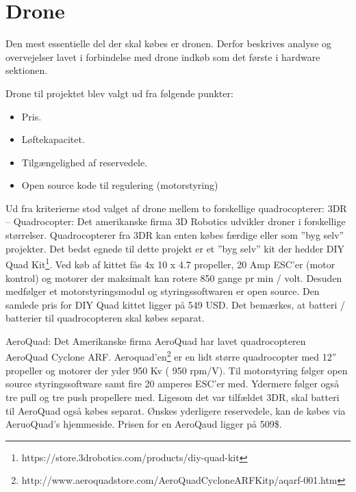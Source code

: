 \section{Drone}

Den mest essentielle del der skal købes er dronen. Derfor beskrives analyse og overvejelser lavet i forbindelse med drone indkøb som det første i hardware sektionen. 
  
Drone til projektet blev valgt ud fra følgende punkter:
\begin{itemize}
	\item Pris.
	\item Løftekapacitet. 
	\item Tilgængelighed af reservedele. 
	\item Open source kode til regulering (motorstyring)
\end{itemize}

\vspace{0.5cm}

Ud fra kriterierne stod valget af drone mellem to forskellige quadrocopterer: 
3DR – Quadrocopter:  Det amerikanske firma 3D Robotics udvikler droner i forskellige størrelser. Quadrocopterer fra 3DR kan enten købes færdige eller som ”byg selv” projekter. Det bedst egnede til dette projekt er et ”byg selv” kit der hedder DIY Quad Kit\footnote{https://store.3drobotics.com/products/diy-quad-kit}. Ved køb af kittet fås 4x 10 x 4.7 propeller, 20 Amp ESC’er (motor kontrol) og motorer der maksimalt kan rotere 850 gange pr min / volt.  Desuden medfølger et motorstyringsmodul og styringssoftwaren er open source. Den samlede pris for DIY Quad kittet ligger på 549 USD. Det bemærkes, at batteri / batterier til quadrocopteren skal købes separat.

AeroQuad: Det Amerikanske firma AeroQuad har lavet quadrocopteren AeroQuad Cyclone ARF. Aeroquad'en\footnote{http://www.aeroquadstore.com/AeroQuad\textunderscore Cyclone\textunderscore ARF\textunderscore Kit\textunderscore p/aqarf-001.htm} er en lidt større quadrocopter med 12” propeller og motorer der yder 950 Kv ( 950 rpm/V). Til motorstyring følger open source styringssoftware samt fire 20 amperes ESC'er med. Ydermere følger også tre pull og tre push propellere med. \newline Ligesom det var tilfældet 3DR, skal batteri til AeroQuad også købes separat. Ønskes yderligere reservedele, kan de købes via AeruoQuad’s hjemmeside. Prisen for en AeroQaud ligger på 509\$.

